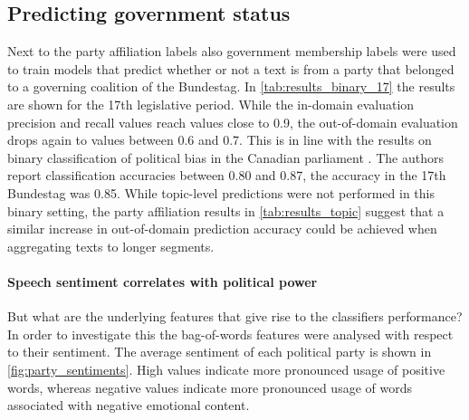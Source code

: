 \documentclass[11pt]{article}
\begin{document}
%


\subsection{Predicting government status}\label{sec:sentiment_result}
Next to the party affiliation labels also government membership labels were used to train models that predict whether or not a text is from a party that belonged to a governing coalition of the Bundestag. In \autoref{tab:results_binary_17} the results are shown for the 17th legislative period. While the in-domain evaluation precision and recall values reach values close to 0.9, the out-of-domain evaluation drops again to values between 0.6 and 0.7. This is in line with the results on binary classification of political bias in the Canadian parliament \cite{Yu2008}. The authors report classification accuracies between 0.80 and 0.87, the accuracy in the 17th Bundestag was 0.85. While topic-level predictions were not performed in this binary setting, the party affiliation results in \autoref{tab:results_topic} suggest that a similar increase in out-of-domain prediction accuracy could be achieved when aggregating texts to longer segments. \\


\paragraph{Speech sentiment correlates with political power} 
But what are the underlying features that give rise to the classifiers performance? In order to investigate this the bag-of-words features were analysed with respect to their sentiment. The average sentiment of each political party is shown in \autoref{fig:party_sentiments}. High values indicate more pronounced usage of positive words, whereas negative values indicate more pronounced usage of words associated with negative emotional content.
\end{document}
